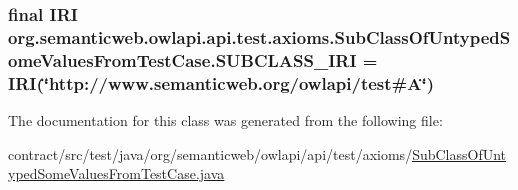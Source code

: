 \hypertarget{classorg_1_1semanticweb_1_1owlapi_1_1api_1_1test_1_1axioms_1_1_sub_class_of_untyped_some_values_from_test_case_a71c8c25d5d3245ebb88195cc8887e38f}{
\subsubsection[{S\-U\-B\-C\-L\-A\-S\-S\-\_\-\-I\-R\-I}]{\setlength{\rightskip}{0pt plus 5cm}final {\bf I\-R\-I} org.\-semanticweb.\-owlapi.\-api.\-test.\-axioms.\-Sub\-Class\-Of\-Untyped\-Some\-Values\-From\-Test\-Case.\-S\-U\-B\-C\-L\-A\-S\-S\-\_\-\-I\-R\-I = {\bf I\-R\-I}(\char`\"{}http\-://www.\-semanticweb.\-org/owlapi/test\#A\char`\"{})\hspace{0.3cm}{\ttfamily [static]}}}\label{classorg_1_1semanticweb_1_1owlapi_1_1api_1_1test_1_1axioms_1_1_sub_class_of_untyped_some_values_from_test_case_a71c8c25d5d3245ebb88195cc8887e38f}


The documentation for this class was generated from the following file\-:\begin{DoxyCompactItemize}
\item 
contract/src/test/java/org/semanticweb/owlapi/api/test/axioms/\hyperlink{_sub_class_of_untyped_some_values_from_test_case_8java}{Sub\-Class\-Of\-Untyped\-Some\-Values\-From\-Test\-Case.\-java}\end{DoxyCompactItemize}
